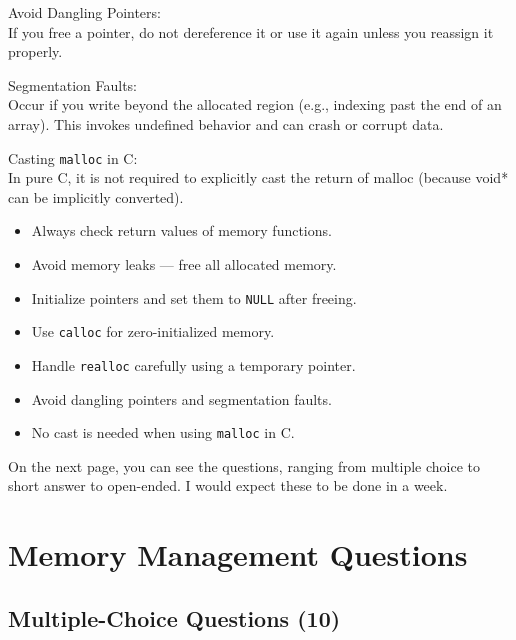 \documentclass[a4paper,12pt]{article}
\begin{document}
Avoid Dangling Pointers:\\
If you free a pointer, do not dereference it or use it again unless you reassign it properly.

Segmentation Faults:\\
Occur if you write beyond the allocated region (e.g., indexing past the end of an array). This invokes undefined behavior and can crash or corrupt data.

Casting \verb|malloc| in C:\\
In pure C, it is not required to explicitly cast the return of malloc (because void* can be implicitly converted).

\begin{tcolorbox}[colback=blue!5!white, colframe=blue!80!black, title=Best Practices for Dynamic Memory]
\begin{itemize}
    \item Always check return values of memory functions.
    \item Avoid memory leaks — free all allocated memory.
    \item Initialize pointers and set them to \texttt{NULL} after freeing.
    \item Use \texttt{calloc} for zero-initialized memory.
    \item Handle \texttt{realloc} carefully using a temporary pointer.
    \item Avoid dangling pointers and segmentation faults.
    \item No cast is needed when using \texttt{malloc} in C.
\end{itemize}
\end{tcolorbox}


\begin{center}
    On the next page, you can see the questions, ranging from multiple choice to short answer to open-ended. I would expect these to be done in a week. 
\end{center}

\hrulefill

\newpage

\section{\huge{Memory Management Questions}}

\subsection{Multiple-Choice Questions (10)}
\end{document}
